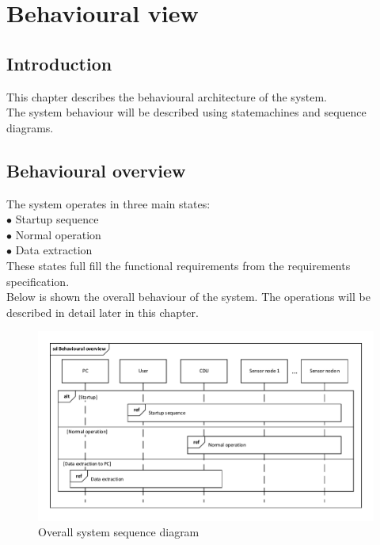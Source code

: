\chapter{Behavioural view}

\section{Introduction}
This chapter describes the behavioural architecture of the system.\\
The system behaviour will be described using statemachines and sequence diagrams.\\

\section{Behavioural overview}
The system operates in three main states:\\
$\bullet$ Startup sequence\\
$\bullet$ Normal operation\\
$\bullet$ Data extraction\\
These states full fill the functional requirements from the requirements specification.\\
Below is shown the overall behaviour of the system. The operations will be described in detail later in this chapter.
\begin{figure}
\centering
\includegraphics[width=.75\textwidth]{billeder/behavioural_overview_SD}
\caption{Overall system sequence diagram}
\end{figure}

